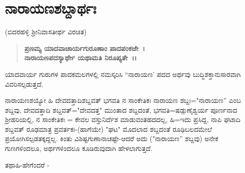 

\begin{center}
\end{center}

\begin{center}
\end{center}

\begin{center}
\phantom{ನರಸಿಂಹೋಖಲಾಜ್ಞಾನಮತಾಂತದಿವಾಕರಃ~।}
\end{center}

\begin{center}
\phantom{\phantom{ಜಯತ್ಯಮಿತಸುಜ್ಞಾನಸುಖಶಕ್ತಿಪಯೋನಿಧಿ:~।।}}
\end{center}

\begin{center}
\phantom{ನ ಮಾಧವಸಮೋ ದೇವೋ ನ ಚ ಮಧ್ವಸಮೋ ಗುರುಃ~।}
\end{center}

\begin{center}
\phantom{\phantom{ನ ತದ್ವಾಕ್ಯಸಮಂ ಶಾಸ್ತಂ ನ ಚ ತಸ್ಯ ಸಮಃ ಪುಮಾನ್~।।}}
\end{center}

\chapter{ನಾರಾಯಣಶಬ್ದಾರ್ಥಃ}

\begin{center}
(ಬಿದರಹಳ್ಳಿ ಶ‍್ರೀನಿವಾಸತೀರ್ಥ ವಿರಚಿತ)
\end{center}

\begin{verse}
 \textbf{ಪ್ರಣಮ್ಯ ಯಾದವಾಚಾರ್ಯಗುರೂಣಾಂ ಪಾದಪಂಕಜೇ~।}\\\textbf{ನಾರಾಯಣಪದಸ್ಯಾರ್ಥೇ ಯಥಾಮತಿ ನಿರೂಪ್ಯತೇ~।।}
\end{verse}

ಯಾದವಾರ್ಯ ಗುರುಗಳ ಪಾದಕಮಲಗಳಲ್ಲಿ ನಮಸ್ಕರಿಸಿ “ನಾರಾಯಣ' ಪದದ ಅರ್ಥವು ಬುದ್ಧಿಶಕ್ತಾನುಸಾರವಾಗಿ ವಿವರಿಸಲ್ಪಡುತ್ತದೆ.

ನಾರಾಯಣಶಯ್ಯೋ ಹಿ ದೇವದತ್ತಾದಿಶಬ್ದವತ್ ಭಗವತಿ ನ ಸಾಂಕೇತಿಕಃ ನಾರಾಯಣ ಶಬ್ದಃ="ನಾರಾಯಣ'' ಎಂಬ ಶಬ್ದವು, ದೇವದತ್ತಾದಿ ಶಬ್ದವತ್="ದೇವದತ್ತ" ಮುಂತಾದ ಶಬ್ದದಂತೆ, ಭಗವತಿ=ಷಡ್ಗುಣೈಶ್ವರ್ಯ ಪೂರ್ಣನಾದ ಶ‍್ರೀಹರಿಯಲ್ಲಿ, ನ ಸಾಂಕೇತಿಕಃ = ಕೇವಲ ವಸ್ತುನಿರ್ದೆಶ ಮಾಡುವಂತಹದದಲ್ಲ, ಹಿ=ಇದು ಪ್ರಸಿದ್ದ, ನಾಪಿ ಘಟಾದಿ ಶಬ್ದವತ್ ರೂಢಮಾತ್ರ ಪ್ರವರ್ತಕಃ-(ಹಾಗೆಯೇ) "ಘಟ" ಮೊದಲಾದ ಶಬ್ದದಂತೆ ರೂಢಿಬಲದಮೇಲೆ ಪ್ರಯೋಗಿಸಲ್ಪಡತಕ್ಕದ್ದಲ್ಲ. ಕಿಂತು ವಿಶಿಷ್ಟಗುಣಾನಾಚಷ್ಟೇ-ಆದರೆ ಅದು ("ನಾರಾಯಣ'' ಶಬ್ದವು) ಅನೇಕ ಗುಣಗಳಿಂದಲೂ, ಅರ್ಥಗಳಿಂದಲೂ ಕೂಡಿರುವುದಾಗಿ ಹೇಳಲಾಗುತ್ತದೆ.

\medskip

\noindent
ತಥಾಹಿ-ಹೇಗೆಂದರೆ -

